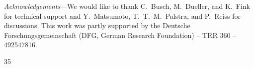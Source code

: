 \documentclass[aps,prl,twocolumn,superscriptaddress]{revtex4-2}
\begin{document}
\textit{Acknowledgements}---We would like to thank C.~Busch, M.~Dueller, and K.~Fink for technical support and Y.~Matsumoto, T.~T.~M.~Palstra, and P.~Reiss for discussions. This work was partly supported by the Deutsche Forschungsgemeinschaft (DFG, German Research Foundation) -- TRR 360 -- 492547816.











\begin{thebibliography}{35}
\makeatletter
\providecommand \@ifxundefined [1]{
 \@ifx{#1\undefined}
}
\providecommand \@ifnum [1]{
 \ifnum #1\expandafter \@firstoftwo
 \else \expandafter \@secondoftwo
 \fi
}
\providecommand \@ifx [1]{
 \ifx #1\expandafter \@firstoftwo
 \else \expandafter \@secondoftwo
 \fi
}
\providecommand \natexlab [1]{#1}
\providecommand \enquote  [1]{``#1''}
\providecommand \bibnamefont  [1]{#1}
\providecommand \bibfnamefont [1]{#1}
\providecommand \citenamefont [1]{#1}
\providecommand \href@noop [0]{\@secondoftwo}
\providecommand \href [0]{\begingroup \@sanitize@url \@href}
\providecommand \@href[1]{\@@startlink{#1}\@@href}
\providecommand \@@href[1]{\endgroup#1\@@endlink}
\providecommand \@sanitize@url [0]{\catcode `\\12\catcode `\$12\catcode
  `\&12\catcode `\#12\catcode `\^12\catcode `\_12\catcode `\%12\relax}
\providecommand \@@startlink[1]{}
\providecommand \@@endlink[0]{}
\providecommand \url  [0]{\begingroup\@sanitize@url \@url }
\providecommand \@url [1]{\endgroup\@href {#1}{\urlprefix }}
\providecommand \urlprefix  [0]{URL }
\providecommand \Eprint [0]{\href }
\providecommand \doibase [0]{https://doi.org/}
\providecommand \selectlanguage [0]{\@gobble}
\providecommand \bibinfo  [0]{\@secondoftwo}
\providecommand \bibfield  [0]{\@secondoftwo}
\providecommand \translation [1]{[#1]}
\providecommand \BibitemOpen [0]{}
\providecommand \bibitemStop [0]{}
\providecommand \bibitemNoStop [0]{.\EOS\space}
\providecommand \EOS [0]{\spacefactor3000\relax}
\providecommand \BibitemShut  [1]{\csname bibitem#1\endcsname}
\let\auto@bib@innerbib\@empty


\end{thebibliography}
\end{document}
